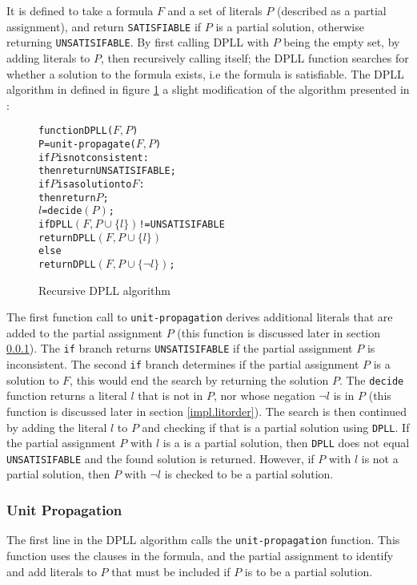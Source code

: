 It is defined to take a formula $F$ and a set of literals $P$ (described as a partial assignment), and return \verb+SATISFIABLE+ if $P$ is a partial solution, 
otherwise returning \verb+UNSATISIFABLE+.
By first calling DPLL with $P$ being the empty set, by adding literals to $P$, then recursively calling itself; 
the DPLL function searches for whether a solution to the formula exists, 
i.e the formula is satisfiable.
The DPLL algorithm in defined in figure \ref{impl.DPLL} a slight modification of the algorithm presented in \citep{dixon2004automating}:
\begin{figure}[h]
\begin{center}
\begin{alltt}
function DPLL(\(F, P\))
   P = unit-propagate(\(F, P\))
   if \(P\) is not consistent:
       then return UNSATISIFABLE;
   if \(P\) is a solution to \(F\):
       then return \(P\);
   \(l\) = decide\((P)\);
   if DPLL\((F, P \cup \{l\})\) != UNSATISIFABLE 
       return DPLL\((F, P \cup \{l\})\)
   else
       return DPLL\((F, P \cup \{\neg l\})\);
\end{alltt}
  \caption{Recursive DPLL algorithm}
  \label{impl.DPLL}
\end{center}
\end{figure}

The first function call to \texttt{unit-propagation} derives additional literals that are added to the partial assignment $P$ (this function is discussed later in section \ref{impl.unit}).
The \verb+if+ branch returns \texttt{UNSATISIFABLE} if the partial assignment $P$ is inconsistent.
The second \verb+if+ branch determines if the partial assignment $P$ is a solution to $F$, this would end the search by returning the solution $P$.
The \texttt{decide} function returns a literal $l$ that is not in $P$, nor whose negation $\neg l$ is in $P$ (this function is discussed later in section \ref{impl.litorder}).
The search is then continued by adding the literal $l$ to $P$ and checking if that is a partial solution using \texttt{DPLL}.
If the partial assignment $P$ with $l$ is a is a partial solution, then \texttt{DPLL} does not equal \texttt{UNSATISIFABLE} and the found solution is returned.
However, if $P$ with $l$ is not a partial solution, then $P$ with $\neg l$ is checked to be a partial solution.

\subsubsection{Unit Propagation}
\label{impl.unit}
The first line in the  DPLL algorithm calls the \texttt{unit-propagation} function.
This function uses the clauses in the formula, and the partial assignment to identify and add literals to $P$ that must be included if $P$ is to be a partial solution.

